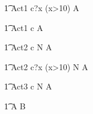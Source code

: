 \begin{circusaction}
        \t1 Act1 \circdef  c?x \prefixcolon (x>10) \then {} \rcirctime A  \\
\end{circusaction}

\begin{circusaction}
       \t1 Act1 \circdef  c \then {} \rcirctime A  \\
\end{circusaction}

\begin{circusaction}
        \t1 Act2 \circdef c \circat N  \then A \\
\end{circusaction}

\begin{circusaction}
        \t1 Act2 \circdef c?x \prefixcolon (x>10) \circat N  \then A \\
\end{circusaction}

\begin{circusaction}
        \t1 Act3 \circdef  c \circat N \then {} \rcirctime A  \\
\end{circusaction}


\begin{circusaction}        
        \t1 \circspot A \circseq B\\
\end{circusaction}

\begin{circus}    
\circend
\end{circus}


